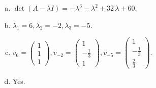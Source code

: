 \begin{questions}
\begin{solution}
\begin{enumerate}[(a)]
\item $\det(A-\lambda I)=-{\lambda}^{3} - {\lambda}^{2} + 32 \, {\lambda} + 60$.
\item ${\lambda}_1=6, {\lambda}_2=-2, {\lambda}_3=-5$.
\item $v_{6}=\left(\begin{array}{r}
1 \\
1 \\
1
\end{array}\right), v_{-2}=\left(\begin{array}{r}
1 \\
-\frac{1}{3} \\
1
\end{array}\right), v_{-5}=\left(\begin{array}{r}
1 \\
-\frac{1}{3} \\
\frac{2}{3}
\end{array}\right)$.
\item Yes.
\end{enumerate}
\end{solution}

\end{questions}

\newpage


\begin{center}
\end{center}

